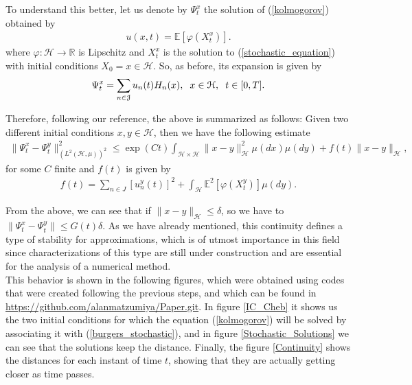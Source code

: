     To understand this better, let us denote by $\Psi^{x}_t$ the solution of (\ref{kolmogorov}) obtained by
    \begin{align*}
    	u(x, t) = \mathbb{E} \left[ \varphi (X^x_t) \right]. 
    \end{align*}
    where $\varphi: \mathcal{H} \rightarrow \mathbb{R}$ is Lipschitz and $X^x_t$ is the solution to (\ref{stochastic_equation}) with initial conditions $X_0 = x \in \mathcal{H}$. So, as before, its expansion is given by
    \begin{align*}
    	\Psi^{x}_t = \displaystyle \sum _{n \in \mathcal{J}} u_n (t) H_n (x), \hspace{2mm} x \in \mathcal{H}, \hspace{2mm} t \in [0, T].
    \end{align*}
    
    Therefore, following our reference, the above is summarized as follows: Given two different initial conditions $x, y \in \mathcal{H}$, then we have the following estimate
	\begin{align*}
		\| \Psi^x_t - \Psi^y_t \|^2_{\left( L^2 (\mathcal{H}, \mu)\right)^2} \leq \exp(Ct) \displaystyle \int_{\mathcal{H} \times \mathcal{H}} \|x - y \|^2_{\mathcal{H}} \mu (dx) \mu (dy) + f(t) \|x - y\|_{\mathcal{H}},
	\end{align*}
	for some $C$ finite and $f(t)$ is given by
	\begin{align*}
		f(t) = \displaystyle \sum_{n \in J} \left[u^y_n (t)\right]^2 + \int_{\mathcal{H}} \mathbb{E}^2 \left[\varphi (X^y_t)\right] \mu (dy).
	\end{align*}	
	
	From the above, we can see that if $ \| x - y \|_{\mathcal{H}} \leq \delta$, so we have to $\| \Psi^x_t - \Psi^y_t \| \leq G (t) \delta$. As we have already mentioned, this continuity defines a type of stability for approximations, which is of utmost importance in this field since characterizations of this type are still under construction and are essential for the analysis of a numerical method. \\
	
	This behavior is shown in the following figures, which were obtained using codes that were created following the previous steps, and which can be found in \url{https://github.com/alanmatzumiya/Paper.git}. In figure \ref{IC_Cheb} it shows us the two initial conditions for which the equation (\ref{kolmogorov}) will be solved by associating it with (\ref{burgers_stochastic}), and in figure \ref{Stochastic_Solutions} we can see that the solutions keep the distance. Finally, the figure \ref{Continuity} shows the distances for each instant of time $t$, showing that they are actually getting closer as time passes.
	
